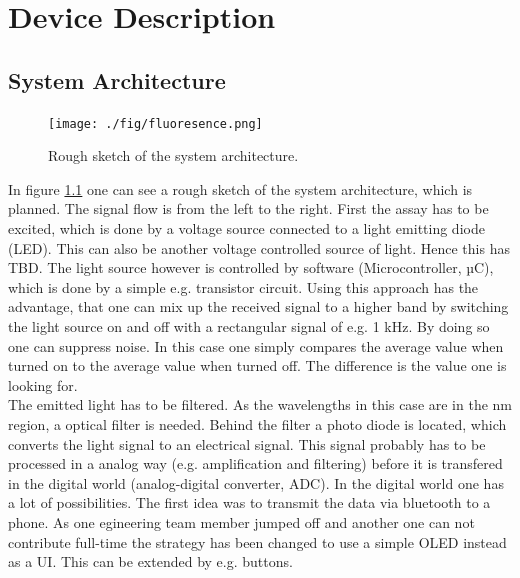 \documentclass{report}
\newcommand{\newpar}{\vspace{1em}\\}
\begin{document}



\pagestyle{fancy}

\tableofcontents
\listoffigures
\newpage
\listoftables

\newpage
\setcounter{roman}{\value{page}}
\setcounter{page}{1}

\chapter{Device Description}
\section{System Architecture}
\begin{figure}[H]
	\texttt{[image: ./fig/fluoresence.png]}
	\caption{Rough sketch of the system architecture.}
	\label{fig:block}
\end{figure}
In figure \ref{fig:block} one can see a rough sketch of the system architecture, which is planned. The signal flow is from the left to the right. First the assay has to be excited, which is done by a voltage source connected to a light emitting diode (LED). This can also be another voltage controlled source of light. Hence this has TBD. The light source however is controlled by software (Microcontroller, µC), which is done by a simple e.g. transistor circuit. Using this approach has the advantage, that one can mix up the received signal to a higher band by switching the light source on and off with a rectangular signal of e.g. 1 kHz. By doing so one can suppress noise. In this case one simply compares the average value when turned on to the average value when turned off. The difference is the value one is looking for.  
\newpar
The emitted light has to be filtered. As the wavelengths in this case are in the nm region, a optical filter is needed. Behind the filter a photo diode is located, which converts the light signal to an electrical signal. This signal probably has to be processed in a analog way (e.g. amplification and filtering) before it is transfered in the digital world (analog-digital converter, ADC). In the digital world one has a lot of possibilities. The first idea was to transmit the data via bluetooth to a phone. As one egineering team member jumped off and another one can not contribute full-time the strategy has been changed to use a simple OLED instead as a UI. This can be extended by e.g. buttons.    
\end{document}
